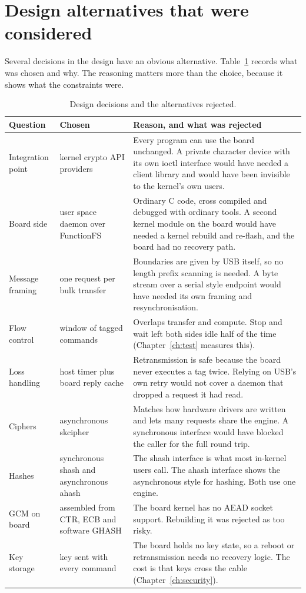 \section{Design alternatives that were considered}

Several decisions in the design have an obvious alternative. Table~\ref{tab:alt} records what was chosen and why. The reasoning matters more than the choice, because it shows what the constraints were.

\begin{table}[ht]
\centering
\small
\begin{tabularx}{\textwidth}{p{2.9cm}p{3.4cm}X}
\toprule
Question & Chosen & Reason, and what was rejected \\
\midrule
Integration point & kernel crypto API providers & Every program can use the board unchanged. A private character device with its own ioctl interface would have needed a client library and would have been invisible to the kernel's own users. \\
Board side & user space daemon over FunctionFS & Ordinary C code, cross compiled and debugged with ordinary tools. A second kernel module on the board would have needed a kernel rebuild and re-flash, and the board had no recovery path. \\
Message framing & one request per bulk transfer & Boundaries are given by USB itself, so no length prefix scanning is needed. A byte stream over a serial style endpoint would have needed its own framing and resynchronisation. \\
Flow control & window of tagged commands & Overlaps transfer and compute. Stop and wait left both sides idle half of the time (Chapter~\ref{ch:test} measures this). \\
Loss handling & host timer plus board reply cache & Retransmission is safe because the board never executes a tag twice. Relying on USB's own retry would not cover a daemon that dropped a request it had read. \\
Ciphers & asynchronous skcipher & Matches how hardware drivers are written and lets many requests share the engine. A synchronous interface would have blocked the caller for the full round trip. \\
Hashes & synchronous shash and asynchronous ahash & The shash interface is what most in-kernel users call. The ahash interface shows the asynchronous style for hashing. Both use one engine. \\
GCM on board & assembled from CTR, ECB and software GHASH & The board kernel has no AEAD socket support. Rebuilding it was rejected as too risky. \\
Key storage & key sent with every command & The board holds no key state, so a reboot or retransmission needs no recovery logic. The cost is that keys cross the cable (Chapter~\ref{ch:security}). \\
\bottomrule
\end{tabularx}
\caption{Design decisions and the alternatives rejected.}\label{tab:alt}
\end{table}

